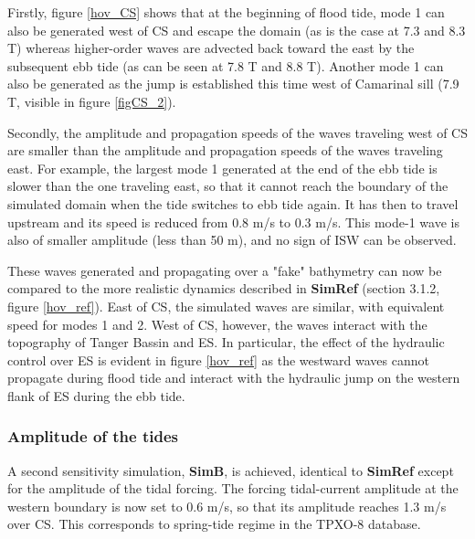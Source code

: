 \documentclass[a4paper,12pt]{article}
\begin{document}
Firstly, figure \ref{hov_CS} shows that at the beginning of flood tide, mode 1 can also be generated west of CS and escape the domain (as is the case at 7.3 and 8.3 T) whereas higher-order waves are advected back toward the east by the subsequent ebb tide (as can be seen at 7.8 T and 8.8 T). Another mode 1 can also be generated as the jump is established this time west of Camarinal sill (7.9 T, visible in figure \ref{figCS_2}).

Secondly, the amplitude and propagation speeds of the waves traveling west of CS are smaller than the amplitude and propagation speeds of the waves traveling east. For example, the largest mode 1 generated at the end of the ebb tide is slower than the one traveling east, so that it cannot reach the boundary of the simulated domain when the tide switches to ebb tide again. It has then to travel upstream and its speed is reduced from 0.8 m/s to 0.3 m/s. This mode-1 wave is also of smaller amplitude (less than 50 m), and no sign of ISW can be observed.

These waves generated and propagating over a "fake" bathymetry can now be compared to the more realistic dynamics described in \textbf{SimRef} (section 3.1.2, figure \ref{hov_ref}). East of CS, the simulated waves are similar, with equivalent speed for modes 1 and 2. West of CS, however, the waves interact with the topography of Tanger Bassin and ES. In particular, the effect of the hydraulic control over ES is evident in figure \ref{hov_ref} as the westward waves cannot propagate during flood tide and interact with the hydraulic jump on the western flank of ES during the ebb tide. 


\subsubsection{Amplitude of the tides}

A second sensitivity simulation, \textbf{SimB}, is achieved, identical to \textbf{SimRef} except for the amplitude of the tidal forcing. The forcing tidal-current amplitude at the western boundary is now set to 0.6 m/s, so that its amplitude reaches 1.3 m/s over CS. This corresponds to spring-tide regime in the TPXO-8 database.
\end{document}
